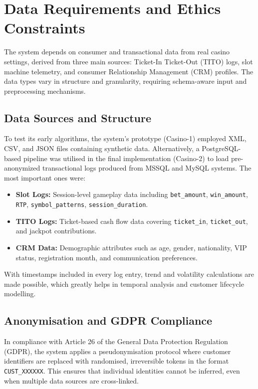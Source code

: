 \documentclass[12pt,a4paper]{report}
\begin{document}
\section{Data Requirements and Ethics Constraints}

The system depends on consumer and transactional data from real casino settings, derived from three main sources: Ticket-In Ticket-Out (TITO) logs, slot machine telemetry, and consumer Relationship Management (CRM) profiles.  The data types vary in structure and granularity, requiring schema-aware input and preprocessing mechanisms.

\subsection*{Data Sources and Structure}

To test its early algorithms, the system's prototype (Casino-1) employed XML, CSV, and JSON files containing synthetic data.  Alternatively, a PostgreSQL-based pipeline was utilised in the final implementation (Casino-2) to load pre-anonymized transactional logs produced from MSSQL and MySQL systems.  The most important ones were:

\begin{itemize}
  \item \textbf{Slot Logs:} Session-level gameplay data including \texttt{bet\_amount}, \texttt{win\_amount}, \texttt{RTP}, \texttt{symbol\_patterns}, \texttt{session\_duration}.
  \item \textbf{TITO Logs:} Ticket-based cash flow data covering \texttt{ticket\_in}, \texttt{ticket\_out}, and jackpot contributions.
  \item \textbf{CRM Data:} Demographic attributes such as age, gender, nationality, VIP status, registration month, and communication preferences.
\end{itemize}

With timestamps included in every log entry, trend and volatility calculations are made possible, which greatly helps in temporal analysis and customer lifecycle modelling.

\subsection*{Anonymisation and GDPR Compliance}

In compliance with Article 26 of the General Data Protection Regulation (GDPR), the system applies a pseudonymisation protocol where customer identifiers are replaced with randomised, irreversible tokens in the format \texttt{CUST\_XXXXXX}. This ensures that individual identities cannot be inferred, even when multiple data sources are cross-linked.
\end{document}

